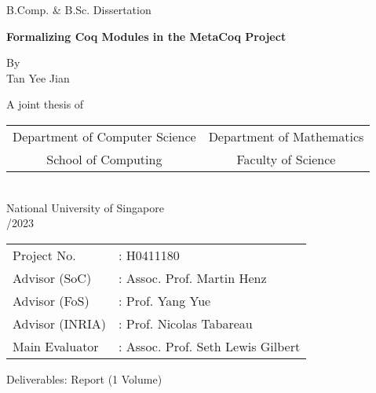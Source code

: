 \begin{titlepage}
  \begin{center}
    \large B.Comp. \& B.Sc. Dissertation


    \huge\textbf{Formalizing Coq Modules in the MetaCoq Project} 


    \large By\\
    \medskip Tan Yee Jian



    A joint thesis of\\\medskip
    \begin{tabular}{ c c }
      Department of Computer Science & Department of Mathematics \\
      School of Computing & Faculty of Science \\
    \end{tabular}\\\medskip
    National University of Singapore\\/2023

  \end{center}

  \large
  \begin{tabular}{ l l }
    Project No. &: H0411180 \\
    Advisor (SoC) &: Assoc. Prof. Martin Henz\\
    Advisor (FoS) &: Prof. Yang Yue\\
    Advisor (INRIA) &: Prof. Nicolas Tabareau\\
    Main Evaluator &: Assoc. Prof. Seth Lewis Gilbert\\
  \end{tabular}

  Deliverables: Report (1 Volume)

\end{titlepage}


